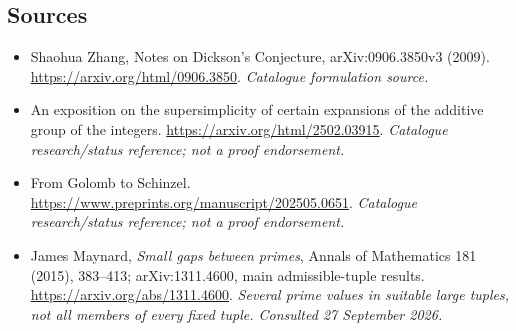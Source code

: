 \documentclass[11pt,a4paper]{article}
\numberwithin{equation}{section}
\begin{document}
\subsection{Sources}
\begin{itemize}\raggedright
\item[\textnormal{[S1]}]\hypertarget{source:1293:1}{} Shaohua Zhang, Notes on Dickson's Conjecture, arXiv:0906.3850v3 (2009).
\url{https://arxiv.org/html/0906.3850}.
{\small\textit{Catalogue formulation source.}}
\item[\textnormal{[S2]}]\hypertarget{source:1293:2}{} An exposition on the supersimplicity of certain expansions of the additive group of the integers.
\url{https://arxiv.org/html/2502.03915}.
{\small\textit{Catalogue research/status reference; not a proof endorsement.}}
\item[\textnormal{[S3]}]\hypertarget{source:1293:3}{} From Golomb to Schinzel.
\url{https://www.preprints.org/manuscript/202505.0651}.
{\small\textit{Catalogue research/status reference; not a proof endorsement.}}

\item[\textnormal{[E1]}]\hypertarget{extra:1293:1}{} James Maynard, \emph{Small gaps between primes}, Annals of Mathematics 181 (2015), 383--413; arXiv:1311.4600, main admissible-tuple results.
\url{https://arxiv.org/abs/1311.4600}.
{\small\textit{Several prime values in suitable large tuples, not all members of every fixed tuple. Consulted 27 September 2026.}}
\end{itemize}
\end{document}
